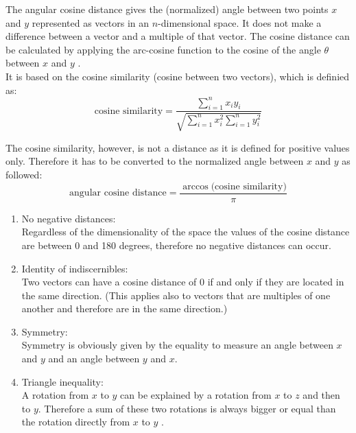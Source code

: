 The angular cosine distance gives the (normalized) angle between two points $x$ and $y$ represented as vectors in an $n$-dimensional space. It does not make a difference between a vector and a multiple of that vector. The cosine distance can be calculated by applying the arc-cosine function to the cosine of the angle $\theta$ between $x$ and $y$ \cite{MMDS}. \\
It is based on the cosine similarity (cosine between two vectors), which is definied as: \\

\begin{equation}
	\text{cosine similarity} = \frac{\sum_{i=1}^{n} x_i y_i}{\sqrt{\sum_{i=1}^{n} x_i^2 \sum_{i=1}^{n} y_i^2}}
\end{equation}  

The cosine similarity, however, is not a distance as it is defined for positive values only. Therefore it has to be converted to the normalized angle between $x$ and $y$ as followed: \\

\begin{equation}
	\text{angular cosine distance} = \frac{\arccos({\text{cosine similarity})}}{\pi}
\end{equation}  


\begin{enumerate}
	\item No negative distances:\\
	Regardless of the dimensionality of the space the values of the cosine distance are between 0 and 180 degrees, therefore no negative distances can occur. 
	\item Identity of indiscernibles:\\
	Two vectors can have a cosine distance of 0 if and only if they are located in the same direction. (This applies also to vectors that are multiples of one another and therefore are in the same direction.) 
	\item Symmetry: \\
	Symmetry is obviously given by the equality to measure an angle between $x$ and $y$ and an angle between $y$ and $x$. 
	\item Triangle inequality: \\
	A rotation from $x$ to $y$ can be explained by a rotation from $x$ to $z$ and then to $y$. Therefore a sum of these two rotations is always bigger or equal than the rotation directly from $x$ to $y$ \cite{MMDS}. 
\end{enumerate}


